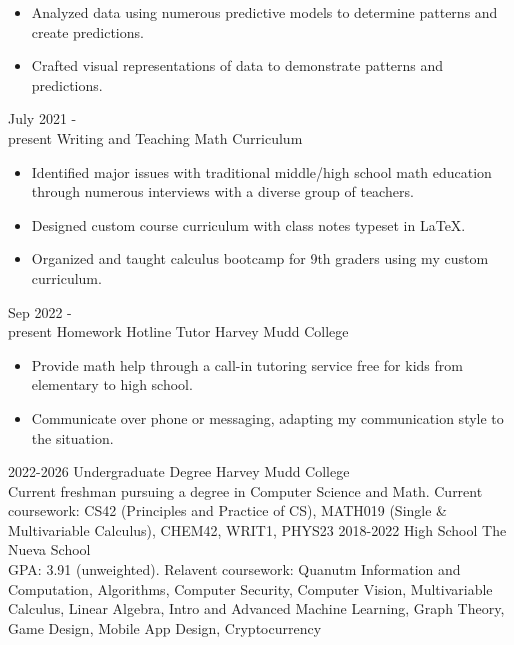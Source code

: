 \documentclass[9pt]{developercv} %
\begin{document}
\begin{entrylist}
{\begin{itemize}[noitemsep, topsep=1pt]
			\item Analyzed data using numerous predictive models to determine patterns and create predictions. 
			\item Crafted visual representations of data to demonstrate patterns and predictions. 
		\end{itemize}}
	\entry
		{July 2021 -\\present}
		{Writing and Teaching Math Curriculum}
		{}
		{\begin{itemize}[noitemsep, topsep=1pt]
			\item Identified major issues with traditional middle/high school math education through numerous
			interviews with a diverse group of teachers.
			\item Designed custom course curriculum with class notes typeset in LaTeX.
			\item Organized and taught calculus bootcamp for 9th graders using my custom curriculum.
		\end{itemize}}
\end{entrylist}

\begin{entrylist}
	\entry 
		{Sep 2022 -\\present} 
		{Homework Hotline Tutor}
		{Harvey Mudd College}
		{\begin{itemize}[noitemsep, topsep=1pt]
			\item Provide math help through a call-in tutoring service free for kids from elementary to high school.
			\item Communicate over phone or messaging, adapting my communication style to the situation.
		\end{itemize}}
\end{entrylist}



\begin{entrylist}
	\entry
		{2022-2026}
		{Undergraduate Degree}
		{Harvey Mudd College}
		{\\Current freshman pursuing a degree in Computer Science and Math. Current coursework: CS42 (Principles and Practice of CS), MATH019 (Single \& Multivariable Calculus), CHEM42, WRIT1, PHYS23}
	\entry
		{2018-2022}
		{High School}
		{The Nueva School}
		{\\GPA: 3.91 (unweighted). Relavent coursework: Quanutm Information and Computation, Algorithms, Computer Security, Computer Vision, Multivariable Calculus, Linear Algebra, Intro and Advanced Machine Learning, Graph Theory, Game Design, Mobile App Design, Cryptocurrency}
\end{entrylist}
\end{document}
